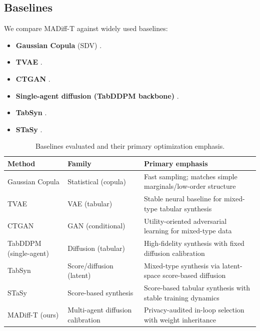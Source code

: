 \documentclass[preprint,12pt]{elsarticle}
\begin{document}
\subsection{Baselines}
We compare MADiff-T against widely used baselines:
\begin{itemize}
    \item \textbf{Gaussian Copula} (SDV) \cite{Patki2016}.
    \item \textbf{TVAE} \cite{Xu2019b}.
    \item \textbf{CTGAN} \cite{Xu2019a}.
    \item \textbf{Single-agent diffusion (TabDDPM backbone)} \cite{Kotelnikov2023}.
    \item \textbf{TabSyn} \cite{Zhang2024}.
    \item \textbf{STaSy} \cite{Kim2023}.
\end{itemize}

\begin{table}[t]
\centering
\caption{Baselines evaluated and their primary optimization emphasis.}
\label{tab:baselines}
\small
\setlength{\tabcolsep}{6pt}
\renewcommand{\arraystretch}{1.12}
\begin{tabular}{p{3.6cm} p{3.0cm} p{6.0cm}}
\toprule
\rowcolor{tablehead}
\textbf{Method} & \textbf{Family} & \textbf{Primary emphasis} \\
\midrule
Gaussian Copula \cite{Patki2016} & Statistical (copula) & Fast sampling; matches simple marginals/low-order structure \\
TVAE \cite{Xu2019b} & VAE (tabular) & Stable neural baseline for mixed-type tabular synthesis \\
CTGAN \cite{Xu2019a} & GAN (conditional) & Utility-oriented adversarial learning for mixed-type data \\
TabDDPM (single-agent) \cite{Kotelnikov2023} & Diffusion (tabular) & High-fidelity synthesis with fixed diffusion calibration \\
TabSyn \cite{Zhang2024} & Score/diffusion (latent) & Mixed-type synthesis via latent-space score-based diffusion \\
STaSy \cite{Kim2023} & Score-based synthesis & Score-based tabular synthesis with stable training dynamics \\
MADiff-T (ours) & Multi-agent diffusion calibration & Privacy-audited in-loop selection with weight inheritance \\
\bottomrule
\end{tabular}
\end{table}
\end{document}
